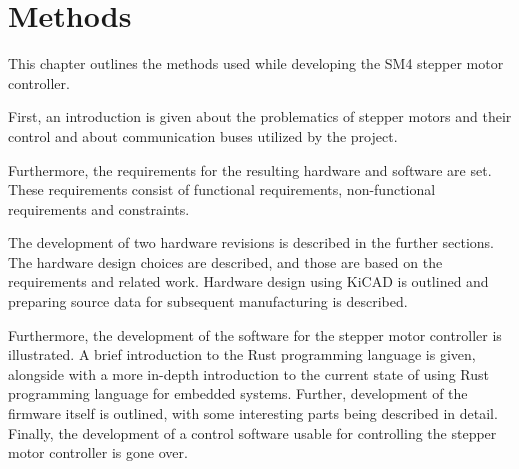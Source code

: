 \chapter{Methods}
\label{ch:methods}
This chapter outlines the methods used while developing the SM4 stepper motor controller.

First, an introduction is given about the problematics of stepper motors and their control and about communication buses utilized by the project.

Furthermore, the requirements for the resulting hardware and software are set.
These requirements consist of functional requirements, non-functional requirements and constraints.

The development of two hardware revisions is described in the further sections.
The hardware design choices are described, and those are based on the requirements and related work.
Hardware design using KiCAD is outlined and preparing source data for subsequent manufacturing is described.

Furthermore, the development of the software for the stepper motor controller is illustrated.
A brief introduction to the Rust programming language is given, alongside with a more in-depth introduction to the current state of using Rust programming language for embedded systems.
Further, development of the firmware itself is outlined, with some interesting parts being described in detail.
Finally, the development of a control software usable for controlling the stepper motor controller is gone over.
